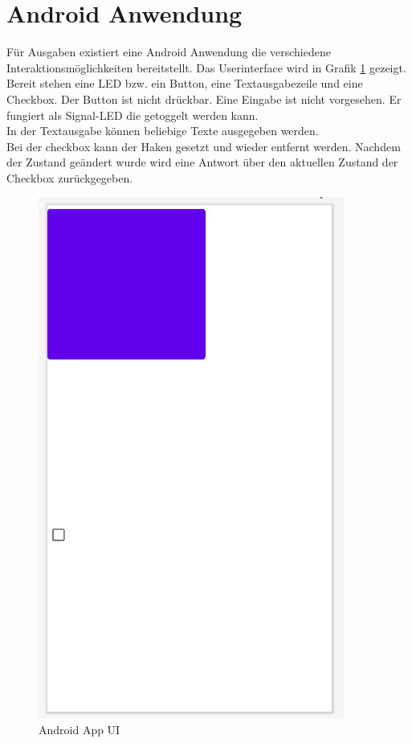 \documentclass[11pt,a4paper]{report}
\begin{document}
\section*{Android Anwendung}
Für Ausgaben existiert eine Android Anwendung die verschiedene Interaktionsmöglichkeiten bereitstellt.
Das Userinterface wird in Grafik \ref{fig:android_ui} gezeigt.
\\
Bereit stehen eine LED bzw. ein Button, eine Textausgabezeile und eine Checkbox.
Der Button ist nicht drückbar.
Eine Eingabe ist nicht vorgesehen.
Er fungiert als Signal-LED die getoggelt werden kann.
\\
In der Textausgabe können beliebige Texte ausgegeben werden.
\\
Bei der checkbox kann der Haken gesetzt und wieder entfernt werden.
Nachdem der Zustand geändert wurde wird eine Antwort über den aktuellen Zustand der Checkbox zurückgegeben.
\begin{figure}[htbp] 
  \centering
  \includegraphics[width=.9\textwidth]{images/android_ui.png}
  \caption{Android App UI}
  \label{fig:android_ui}
\end{figure}
\end{document}
